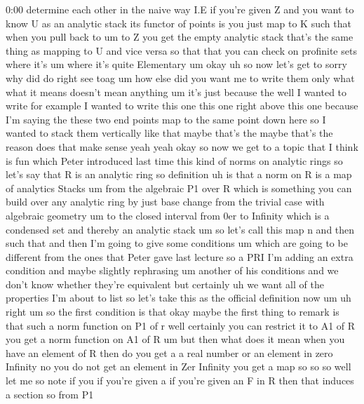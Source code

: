 \begin{unfinished}{0:00}
determine  each  other  in  the  naive  way
I.E  if  you're  given  Z  and  you  want  to
know  U  as  an  analytic  stack  its  functor
of  points  is  you  just  map  to  K  such  that
when  you  pull  back  to  um  to  Z  you  get
the  empty  analytic  stack  that's  the  same
thing  as  mapping  to  U  and  vice
versa  so  that  that  you  can  check  on
profinite
sets  where  it's  um  where  it's  quite
Elementary
um
okay
uh  so  now  let's  get
to  sorry  why  did  do  right  see
toag  um  how  else  did  you  want  me  to
write  them  only  what  what  it
means  doesn't  mean  anything  um  it's  just
because  the  well  I  wanted  to  write  for
example  I  wanted  to  write  this  one  this
one  right  above  this  one  because  I'm
saying  the  these  two  end  points  map  to
the  same  point  down  here  so  I  wanted  to
stack  them  vertically  like  that  maybe
that's  the  maybe  that's  the  reason  does
that  make  sense
yeah  yeah
okay  so  now  we  get  to  a  topic  that  I
think  is  fun  which  Peter  introduced  last
time  this  kind  of  norms  on  analytic
rings  so  let's  say  that  R  is  an  analytic
ring  so  definition  uh  is  that  a  norm  on
R  is  a
map  of  analytics
Stacks  um  from  the  algebraic  P1  over  R
which  is  something  you  can  build  over
any  analytic  ring  by  just  base  change
from
the  trivial  case  with  algebraic  geometry
um  to  the  closed  interval  from  0er  to
Infinity  which  is  a  condensed  set  and
thereby  an  analytic  stack  um  so  let's
call  this  map  n  and  then  such  that  and
then  I'm  going  to  give  some
conditions
um  which  are  going  to  be  different  from
the  ones  that  Peter  gave  last  lecture  so
a  PRI  I'm  adding  an  extra  condition  and
maybe  slightly
rephrasing  um  another  of  his  conditions
and  we  don't  know  whether  they're
equivalent  but  certainly  uh  we  want  all
of  the  properties  I'm  about  to  list  so
let's  take  this  as  the  official
definition  now
um
uh  right
um  so  the  first  condition  is
that  okay  maybe  the  first  thing  to
remark  is  that  such  a  norm  function  on
P1  of  r  well  certainly  you  can  restrict
it  to  A1  of  R  you  get  a  norm  function  on
A1  of
R  um  but  then  what  does  it  mean  when  you
have  an  element  of  R  then  do  you  get  a  a
real  number  or  an  element  in  zero
Infinity  no  you  do  not  get  an  element  in
Zer  Infinity  you  get  a  map  so  so  so  well
let  me  so  note  if  you  if  you're  given  a
if  you're  given  an  F  in
R  then  that  induces  a  section  so  from  P1

\end{unfinished}
